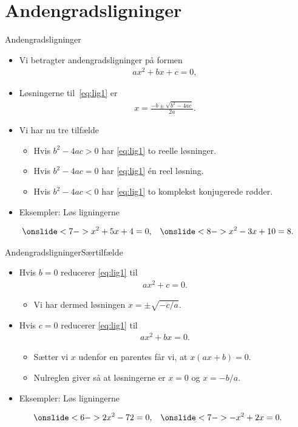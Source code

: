 \section{Andengradsligninger}
\begin{frame}{Andengradsligninger}
\begin{itemize}
		\setlength\itemsep{1em}
	\item<1-> Vi betragter andengradsligninger på formen
	\begin{align}\label{eq:lig1}
	ax^2+bx+c=0,
	\end{align}
	\item<2-> Løsningerne til~\eqref{eq:lig1} er
	\begin{align*}
	x=\frac{-b\pm \sqrt{b^2-4ac}}{2a}.
	\end{align*}
	\item<3-> Vi har nu tre tilfælde
	\begin{itemize}
			\setlength\itemsep{1em}
		\item<4-> Hvis $b^2-4ac>0$ har \eqref{eq:lig1} to reelle løsninger.
		\item<5-> Hvis $b^2-4ac=0$ har \eqref{eq:lig1} én reel løsning.
		\item<6-> Hvis $b^2-4ac<0$ har \eqref{eq:lig1} to komplekst konjugerede rødder.
	\end{itemize}
	\item<7-> Eksempler: Løs ligningerne
\end{itemize}
	\begin{align*}
\onslide<7->{x^2+5x+4=0,}&&\onslide<8->{x^2-3x+10=8.}
\end{align*}
\end{frame}

\begin{frame}{Andengradsligninger}{Særtilfælde}
\begin{itemize}
		\setlength\itemsep{1em}
	\item<1-> Hvis $b=0$ reducerer \eqref{eq:lig1} til
	\begin{align*}
	ax^2+c=0.
	\end{align*}
	\begin{itemize}
		\item<2-> Vi har dermed løsningen $x=\pm \sqrt{-c/a}$.
	\end{itemize}
	\item<3-> Hvis $c=0$ reducerer \eqref{eq:lig1} til
	\begin{align*}
	ax^2+bx=0.
	\end{align*}
	\begin{itemize}
			\setlength\itemsep{1em}
		\item<4-> Sætter vi $x$ udenfor en parentes får vi, at $x(ax+b)=0$.
		\item<5-> Nulreglen giver så at løsningerne er $x=0$ og $x=-b/a$.
	\end{itemize}
	\item<6-> Eksempler: Løs ligningerne

\end{itemize}
	\begin{align*}
\onslide<6->{2x^2-72=0,}&& \onslide<7->{-x^2+2x=0.}
\end{align*}
\end{frame}

